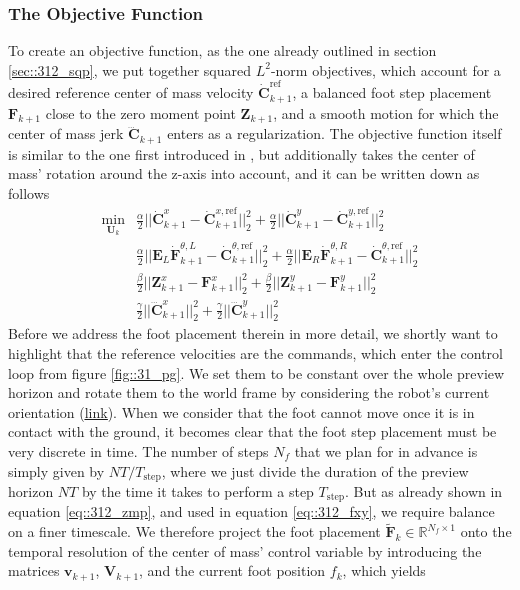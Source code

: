 \subsubsection{The Objective Function}
To create an objective function, as the one already outlined in section \ref{sec::312_sqp}, we put together squared $L^2$-norm objectives, which account for a desired reference center of mass velocity $\dot{\bm{C}}_{k+1}^\text{ref}$, a balanced foot step placement $\textbf{F}_{k+1}$ close to the zero moment point $\bm{Z}_{k+1}$, and a smooth motion for which the center of mass jerk $\dddot{\bm{C}}_{k+1}$ enters as a regularization. The objective function itself is similar to the one first introduced in \cite{herdt2010online}, but additionally takes the center of mass' rotation around the z-axis into account, and it can be written down as follows
\begin{align}
	\min_{\bm{U}_k} &\frac{\alpha}{2}||\dot{\bm{C}}^x_{k+1} - \dot{\bm{C}}_{k+1}^{x,\text{ref}}||_2^2 + \frac{\alpha}{2}||\dot{\bm{C}}^y_{k+1} - \dot{\bm{C}}_{k+1}^{y,\text{ref}}||_2^2 
	\label{eq::312_dcxy}\\
	&\frac{\alpha}{2}||\bm{E}_L\dot{\bm{F}}^{\theta,L}_{k+1} - \dot{\bm{C}}_{k+1}^{\theta,\text{ref}}||_2^2 + 	\frac{\alpha}{2}||\bm{E}_R\dot{\bm{F}}^{\theta,R}_{k+1} - \dot{\bm{C}}_{k+1}^{\theta,\text{ref}}||_2^2 
	\label{eq::312_dftheta} \\
	&\frac{\beta}{2}||\bm{Z}^x_{k+1}-\bm{F}^x_{k+1}||^2_2 + \frac{\beta}{2}||\bm{Z}^y_{k+1}-\bm{F}^y_{k+1}||^2_2 
	\label{eq::312_fxy}\\
	&\frac{\gamma}{2}||\dddot{\bm{C}}_{k+1}^x||^2_2 + \frac{\gamma}{2}||\dddot{\bm{C}}_{k+1}^y||^2_2	
	\label{eq::312_dddcxy}
\end{align}
Before we address the foot placement therein in more detail, we shortly want to highlight that the reference velocities are the commands, which enter the control loop from figure \ref{fig::31_pg}. We set them to be constant over the whole preview horizon and rotate them to the world frame  by considering the robot's current orientation (\href{https://github.com/mhubii/nmpc_pattern_generator/blob/5a213044c927dc6aac9f7e32ce1e5fb472cd67bb/libs/pattern_generator/src/base_generator.cpp#L324}{\underline{link}}). When we consider that the foot cannot move once it is in contact with the ground, it becomes clear that the foot step placement must be very discrete in time. The number of steps $N_f$ that we plan for in advance is simply given by $NT/T_\text{step}$, where we just divide the duration of the preview horizon $NT$ by the time it takes to perform a step $T_\text{step}$. But as already shown in equation \ref{eq::312_zmp}, and used in equation \ref{eq::312_fxy}, we require balance on a finer timescale. We therefore project the foot placement $\tilde{\bm{F}}_k\in\mathbb{R}^{N_f\times1}$ onto the temporal resolution of the center of mass' control variable by introducing the matrices $\bm{v}_{k+1}$, $\bm{V}_{k+1}$, and the current foot position $f_k$, which yields
